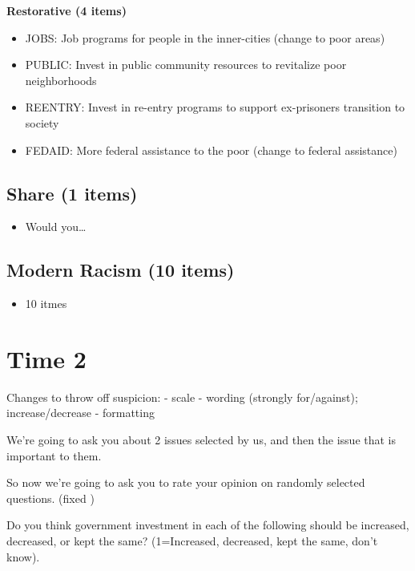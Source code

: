 \documentclass[
]{book}
\providecommand{\tightlist}{%
  \setlength{\itemsep}{0pt}\setlength{\parskip}{0pt}}
\begin{document}
\textbf{Restorative (4 items)}

\begin{itemize}
\tightlist
\item
  JOBS: Job programs for people in the inner-cities (change to poor areas)
\item
  PUBLIC: Invest in public community resources to revitalize poor neighborhoods
\item
  REENTRY: Invest in re-entry programs to support ex-prisoners transition to society
\item
  FEDAID: More federal assistance to the poor (change to federal assistance)
\end{itemize}

\hypertarget{share-1-items}{%
\subsection{Share (1 items)}\label{share-1-items}}

\begin{itemize}
\tightlist
\item
  Would you\ldots{}
\end{itemize}

\hypertarget{modern-racism-10-items}{%
\subsection{Modern Racism (10 items)}\label{modern-racism-10-items}}

\begin{itemize}
\tightlist
\item
  10 itmes
\end{itemize}

\hypertarget{time-2}{%
\section{Time 2}\label{time-2}}

Changes to throw off suspicion:
- scale
- wording (strongly for/against); increase/decrease
- formatting

We're going to ask you about 2 issues selected by us, and then the issue that is important to them.

So now we're going to ask you to rate your opinion on randomly selected questions. (fixed )

Do you think government investment in each of the following should be increased, decreased, or kept the same? (1=Increased, decreased, kept the same, don't know).
\end{document}
